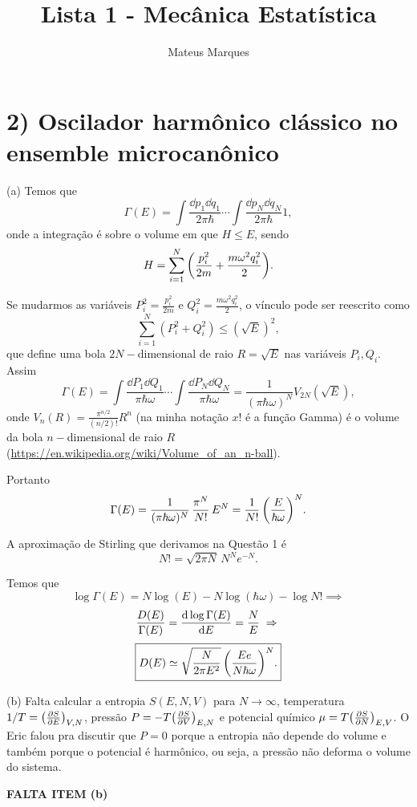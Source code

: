 \documentclass[a4paper,10pt]{article}
\title{\Huge{\textbf{Lista 1 - Mecânica Estatística}}}
\author{Mateus Marques}
\begin{document}
\maketitle

\section*{2) Oscilador harmônico clássico no ensemble microcanônico}

(a) Temos que
$$
\Gamma(E) = \int \frac{\dd{p_1} \dd{q_1}}{2\pi\hbar} \cdots \int \frac{\dd{p_N} \dd{q_N}}{2\pi\hbar} 1,
$$
onde a integração é sobre o volume em que $H \leq E$, sendo
$$
H = \sum_{i=1}^{N}
\qty(
\frac{p_i^2}{2m} + \frac{m\omega^2 q_i^2}{2}
).
$$

Se mudarmos as variáveis $P_i^2 = \frac{p_i^2}{2m}$ e $Q_i^2 = \frac{m \omega^2 q_i^2}{2}$, o vínculo pode ser reescrito como
$$
\sum_{i=1}^{N} (P_i^2 + Q_i^2) \leq (\sqrt{E})^2,
$$
que define uma bola $2N-$dimensional de raio $R = \sqrt{E}$ nas variáveis $P_i, Q_i$. Assim
$$
\Gamma(E) = \int \frac{\dd{P_1} \dd{Q_1}}{\pi\hbar \omega} \cdots \int \frac{\dd{P_N} \dd{Q_N}}{\pi\hbar \omega} =
\frac{1}{(\pi \hbar \omega)^N} V_{2N}(\sqrt{E}),
$$
onde $V_n(R) = \frac{\pi^{n/2}}{(n/2)!} R^n$ (na minha notação $x!$ é a função Gamma) é o volume da bola $n-$dimensional de raio $R$ (\url{https://en.wikipedia.org/wiki/Volume_of_an_n-ball}).

Portanto
$$
\Gamma(E) =
\frac{1}{(\pi \hbar \omega)^N} \, \frac{\pi^N}{N!} \, E^N = \frac{1}{N!} \, \qty(\frac{E}{\hbar\omega})^N.
$$

A aproximação de Stirling que derivamos na Questão 1 é
$$
N! = \sqrt{2\pi N} \, N^N e^{-N}.
$$

Temos que
$$
\log \Gamma(E) = N \log(E) - N \log(\hbar\omega) - \log N! \implies
$$
$$
\frac{D(E)}{\Gamma(E)} = \dv{\log \Gamma(E)}{E} = \frac{N}{E} \; \Rightarrow \;
$$
$$
\boxed{ D(E) \simeq \sqrt{\frac{N}{2\pi E^2}} \, \qty(\frac{E e}{N \hbar\omega})^N .}
$$

\n\n

(b) Falta calcular a entropia $S(E, N, V)$ para $N \to \infty$, temperatura $1/T = \qty(\pdv{S}{E})_{V,N}$, pressão $P = -T \qty(\pdv{S}{V})_{E,N}$ e potencial químico $\mu = T \qty(\pdv{S}{N})_{E, V}$. O Eric falou pra discutir que $P = 0$ porque a entropia não depende do volume e também porque o potencial é harmônico, ou seja, a pressão não deforma o volume do sistema.

\textbf{FALTA ITEM (b)}


\pagebreak
\end{document}
